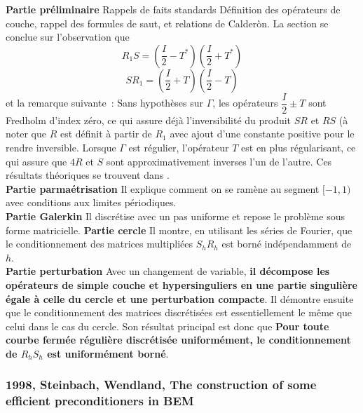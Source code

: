 \documentclass[11pt,a4paper]{article}
\begin{document}
\textbf{Partie préliminaire} Rappels de faits standards
Définition des opérateurs de couche, rappel des formules de saut, et relations de Calderòn. La section se conclue sur l'observation que 
\[R_1S = \left(\dfrac{I}{2}-T^*\right)\left(\dfrac{I}{2}+T^*\right)\]
\[SR_1 = \left(\dfrac{I}{2}+T\right)\left(\dfrac{I}{2}-T\right)\]
et la remarque suivante~: Sans hypothèses sur $\Gamma$, les opérateurs $\dfrac{I}{2}\pm T$ sont Fredholm d'index zéro, ce qui assure déjà l'inversibilité du produit $SR$ et $RS$ (à noter que $R$ est définit à partir de $R_1$ avec ajout d'une constante positive pour le rendre inversible. Lorsque $\Gamma$ est régulier, l'opérateur $T$ est en plus régularisant, ce qui assure que $4R$ et $S$ sont approximativement inverses l'un de l'autre. Ces résultats théoriques se trouvent dans \cite{verchota1984layer}. \\
\textbf{Partie parmaétrisation} Il explique comment on se ramène au segment $[-1,1)$ avec conditions aux limites périodiques. \\
\textbf{Partie Galerkin} Il discrétise avec un pas uniforme et repose le problème sous forme matricielle. 
\textbf{Partie cercle} Il montre, en utilisant les séries de Fourier, que le conditionnement des matrices multipliées $S_hR_h$ est borné indépendamment de $h$. \\
\textbf{Partie perturbation} Avec un changement de variable, \textbf{il décompose les opérateurs de simple couche et hypersinguliers en une partie singulière égale à celle du cercle et une perturbation compacte}. Il démontre ensuite que le conditionnement des matrices discrétisées est essentiellement le même que celui dans le cas du cercle. Son résultat principal est donc que \textbf{Pour toute courbe fermée régulière discrétisée uniformément, le conditionnement de $R_hS_h$ est uniformément borné}. 

\subsubsection{1998, Steinbach, Wendland, The construction of some efficient preconditioners in BEM \cite{steinbach1998construction,steinbach1995efficient}}
\end{document}
